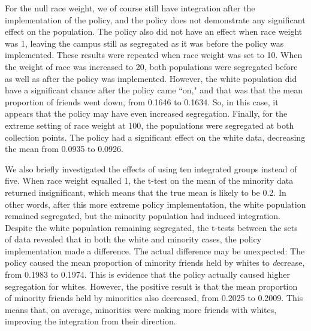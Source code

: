 For the null race weight, we of course still have integration after the implementation of the policy, and the policy does not 
demonstrate any significant effect on the population. The policy also did not have an effect when race weight was 1, leaving 
the campus still as segregated as it was before the policy was implemented. These results were repeated when race weight was 
set to 10. When the weight of race was increased to 20, both populations were segregated before as well as after the policy 
was implemented. However, the white population did have a significant chance after the policy came ``on," and that was that 
the mean proportion of friends went down, from 0.1646 to 0.1634. So, in this case, it appears that the policy may have even 
increased segregation. Finally, for the extreme setting of race weight at 100, the populations were segregated at both 
collection points. The policy had a significant effect on the white data, decreasing the mean from 0.0935 to 0.0926.

We also briefly investigated the effects of using ten integrated groups instead of five. When race weight equalled 1, the 
t-test on the mean of the minority data returned insignificant, which means that the true mean is likely to be 0.2. In other 
words, after this more extreme policy implementation, the white population remained segregated, but the minority population 
had induced integration. Despite the white population remaining segregated, the t-tests between the sets of data revealed 
that in both the white and minority cases, the policy implementation made a difference. The actual difference may 
be unexpected: The policy caused the mean proportion of minority friends held by whites to {\emph decrease}, from 0.1983 to 
0.1974. This is evidence that the policy actually caused higher segregation for whites. However, the positive result is that 
the mean proportion of minority friends held by minorities also decreased, from 0.2025 to 0.2009. This means that, on 
average, minorities were making more friends with whites, improving the integration from their direction.

